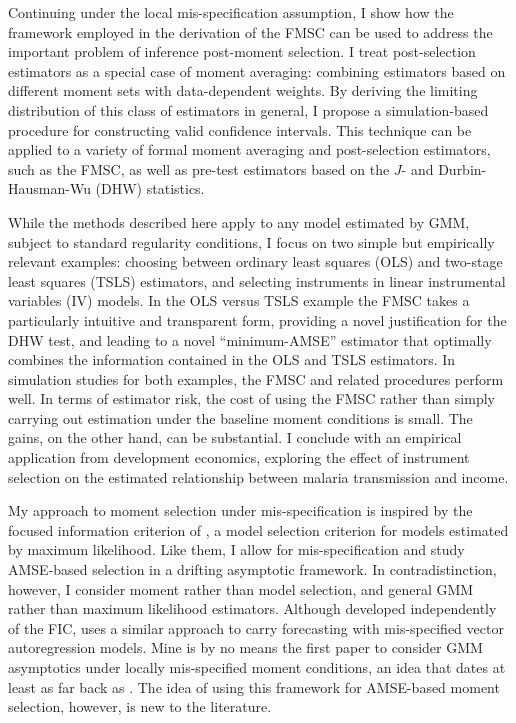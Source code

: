 Continuing under the local mis-specification assumption, I show how the framework employed in the derivation of the FMSC can be used to address the important problem of inference post-moment selection.
I treat post-selection estimators as a special case of moment averaging: combining estimators based on different moment sets with data-dependent weights.
By deriving the limiting distribution of this class of estimators in general, I propose a simulation-based procedure for constructing valid confidence intervals. 
This technique can be applied to a variety of formal moment averaging and post-selection estimators, such as the FMSC, as well as pre-test estimators based on the $J$- and Durbin-Hausman-Wu (DHW) statistics.

While the methods described here apply to any model estimated by GMM, subject to standard regularity conditions, I focus on two simple but empirically relevant examples: choosing between ordinary least squares (OLS) and two-stage least squares (TSLS) estimators, and selecting instruments in linear instrumental variables (IV) models. 
In the OLS versus TSLS example the FMSC takes a particularly intuitive and transparent form, providing a novel justification for the DHW test, and leading to a novel ``minimum-AMSE'' estimator that optimally combines the information contained in the OLS and TSLS estimators.
In simulation studies for both examples, the FMSC and related procedures perform well.
In terms of estimator risk, the cost of using the FMSC rather than simply carrying out estimation under the baseline moment conditions is small.
The gains, on the other hand, can be substantial.
I conclude with an empirical application from development economics, exploring the effect of instrument selection on the estimated relationship between malaria transmission and income.

My approach to moment selection under mis-specification is inspired by the focused information criterion of \citet{ClaeskensHjort2003}, a model selection criterion for models estimated by maximum likelihood. 
Like them, I allow for mis-specification and study AMSE-based selection in a drifting asymptotic framework. 
In contradistinction, however, I consider moment rather than model selection, and general GMM rather than maximum likelihood estimators.
Although developed independently of the FIC, \cite{Schorfheide2005} uses a similar approach to carry forecasting with mis-specified vector autoregression models.
Mine is by no means the first paper to consider GMM asymptotics under locally mis-specified moment conditions, an idea that dates at least as far back as \cite{Newey1985}.
The idea of using this framework for AMSE-based moment selection, however, is new to the literature. 

